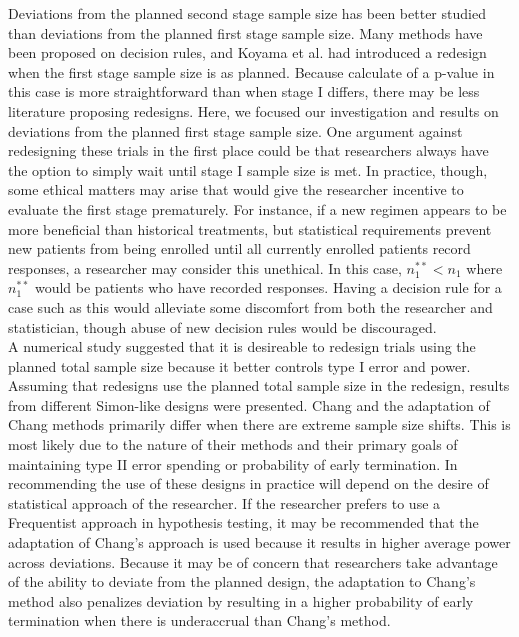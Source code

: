 \documentclass[12pt]{report}\usepackage[]{graphicx}\usepackage[]{color}
\newlength{\li}\setlength{\li}{14.48pt}
\newlength{\di}\setlength{\di}{-3.5mm}
\begin{document}
Deviations from the planned second stage sample size has been better studied than deviations from the planned first stage sample size. Many methods have been proposed on decision rules, and Koyama et al. had introduced a redesign when the first stage sample size is as planned. Because calculate of a p-value in this case is more straightforward than when stage I differs, there may be less literature proposing redesigns. Here, we focused our investigation and results on deviations from the planned first stage sample size. One argument against redesigning these trials in the first place could be that researchers always have the option to simply wait until stage I sample size is met. In practice, though, some ethical matters may arise that would give the researcher incentive to evaluate the first stage prematurely. For instance, if a new regimen appears to be more beneficial than historical treatments, but statistical requirements prevent new patients from being enrolled until all currently enrolled patients record responses, a researcher may consider this unethical. In this case, $n_1^{\ast\ast} < n_1$ where $n_1^{\ast\ast}$ would be patients who have recorded responses. Having a decision rule for a case such as this would alleviate some discomfort from both the researcher and statistician, though abuse of new decision rules would be discouraged. \\
\indent A numerical study suggested that it is desireable to redesign trials using the planned total sample size because it better controls type I error and power. Assuming that redesigns use the planned total sample size in the redesign, results from different Simon-like designs were presented.  Chang and the adaptation of Chang methods primarily differ when there are extreme sample size shifts. This is most likely due to the nature of their methods and their primary goals of maintaining type II error spending or probability of early termination. In recommending the use of these designs in practice will depend on the desire of statistical approach of the researcher. If the researcher prefers to use a Frequentist approach in hypothesis testing, it may be recommended that the adaptation of Chang's approach is used because it results in higher average power across deviations. Because it may be of concern that researchers take advantage of the ability to deviate from the planned design, the adaptation to Chang's method also penalizes deviation by resulting in a higher probability of early termination when there is underaccrual than Chang's method. \\
\end{document}
